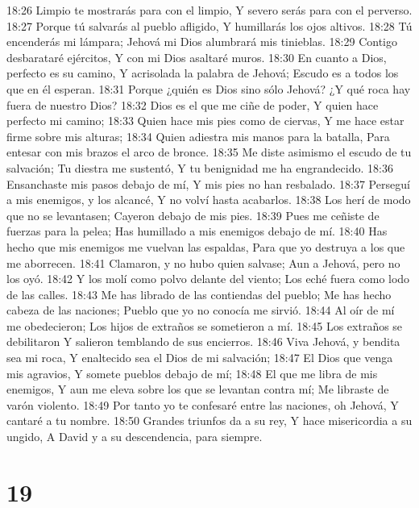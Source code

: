 18:26 Limpio te mostrarás para con el limpio, 
Y severo serás para con el perverso. 
18:27 Porque tú salvarás al pueblo afligido, 
Y humillarás los ojos altivos. 
18:28 Tú encenderás mi lámpara; 
Jehová mi Dios alumbrará mis tinieblas. 
18:29 Contigo desbarataré ejércitos, 
Y con mi Dios asaltaré muros. 
18:30 En cuanto a Dios, perfecto es su camino, 
Y acrisolada la palabra de Jehová; 
Escudo es a todos los que en él esperan. 
18:31 Porque ¿quién es Dios sino sólo Jehová? 
¿Y qué roca hay fuera de nuestro Dios? 
18:32 Dios es el que me ciñe de poder, 
Y quien hace perfecto mi camino; 
18:33 Quien hace mis pies como de ciervas, 
Y me hace estar firme sobre mis alturas; 
18:34 Quien adiestra mis manos para la batalla, 
Para entesar con mis brazos el arco de bronce. 
18:35 Me diste asimismo el escudo de tu salvación; 
Tu diestra me sustentó, 
Y tu benignidad me ha engrandecido. 
18:36 Ensanchaste mis pasos debajo de mí, 
Y mis pies no han resbalado. 
18:37 Perseguí a mis enemigos, y los alcancé, 
Y no volví hasta acabarlos. 
18:38 Los herí de modo que no se levantasen; 
Cayeron debajo de mis pies. 
18:39 Pues me ceñiste de fuerzas para la pelea; 
Has humillado a mis enemigos debajo de mí. 
18:40 Has hecho que mis enemigos me vuelvan las espaldas, 
Para que yo destruya a los que me aborrecen. 
18:41 Clamaron, y no hubo quien salvase; 
Aun a Jehová, pero no los oyó. 
18:42 Y los molí como polvo delante del viento; 
Los eché fuera como lodo de las calles. 
18:43 Me has librado de las contiendas del pueblo; 
Me has hecho cabeza de las naciones; 
Pueblo que yo no conocía me sirvió. 
18:44 Al oír de mí me obedecieron; 
Los hijos de extraños se sometieron a mí. 
18:45 Los extraños se debilitaron 
Y salieron temblando de sus encierros. 
18:46 Viva Jehová, y bendita sea mi roca, 
Y enaltecido sea el Dios de mi salvación; 
18:47 El Dios que venga mis agravios, 
Y somete pueblos debajo de mí; 
18:48 El que me libra de mis enemigos, 
Y aun me eleva sobre los que se levantan contra mí; 
Me libraste de varón violento. 
18:49 Por tanto yo te confesaré entre las naciones, oh Jehová, 
Y cantaré a tu nombre. 
18:50 Grandes triunfos da a su rey, 
Y hace misericordia a su ungido, 
A David y a su descendencia, para siempre. 

\chapter{19}

